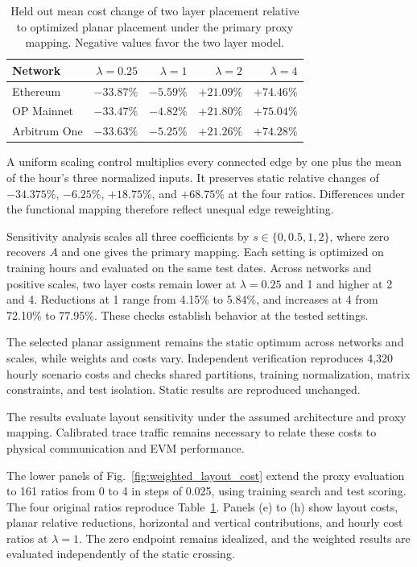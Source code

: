 \documentclass[runningheads]{llncs}
\begin{document}
\begin{table}[H]

\caption{Held out mean cost change of two layer placement relative to optimized planar placement under the primary proxy mapping. Negative values favor the two layer model.}\label{tab:weighted_results}
\centering\small
\begin{tabular*}{\linewidth}{@{\extracolsep{\fill}}lrrrr@{}}
\toprule Network & $\lambda=0.25$ & $\lambda=1$ & $\lambda=2$ & $\lambda=4$ \\\midrule
Ethereum & $-33.87\%$ & $-5.59\%$ & $+21.09\%$ & $+74.46\%$ \\
OP Mainnet & $-33.47\%$ & $-4.82\%$ & $+21.80\%$ & $+75.04\%$ \\
Arbitrum One & $-33.63\%$ & $-5.25\%$ & $+21.26\%$ & $+74.28\%$ \\
\bottomrule
\end{tabular*}

\end{table}
\FloatBarrier

A uniform scaling control multiplies every connected edge by one plus the mean of the hour's three normalized inputs. It preserves static relative changes of $-34.375\%$, $-6.25\%$, $+18.75\%$, and $+68.75\%$ at the four ratios. Differences under the functional mapping therefore reflect unequal edge reweighting.

Sensitivity analysis scales all three coefficients by $s\in\{0,0.5,1,2\}$, where zero recovers $A$ and one gives the primary mapping. Each setting is optimized on training hours and evaluated on the same test dates. Across networks and positive scales, two layer costs remain lower at $\lambda=0.25$ and 1 and higher at 2 and 4. Reductions at 1 range from 4.15\% to 5.84\%, and increases at 4 from 72.10\% to 77.95\%. These checks establish behavior at the tested settings.

\FloatBarrier

The selected planar assignment remains the static optimum across networks and scales, while weights and costs vary. Independent verification reproduces 4,320 hourly scenario costs and checks shared partitions, training normalization, matrix constraints, and test isolation. Static results are reproduced unchanged.

The results evaluate layout sensitivity under the assumed architecture and proxy mapping. Calibrated trace traffic remains necessary to relate these costs to physical communication and EVM performance.

The lower panels of Fig.~\ref{fig:weighted_layout_cost} extend the proxy evaluation to 161 ratios from 0 to 4 in steps of 0.025, using training search and test scoring. The four original ratios reproduce Table~\ref{tab:weighted_results}. Panels (e) to (h) show layout costs, planar relative reductions, horizontal and vertical contributions, and hourly cost ratios at $\lambda=1$. The zero endpoint remains idealized, and the weighted results are evaluated independently of the static crossing.
\end{document}
